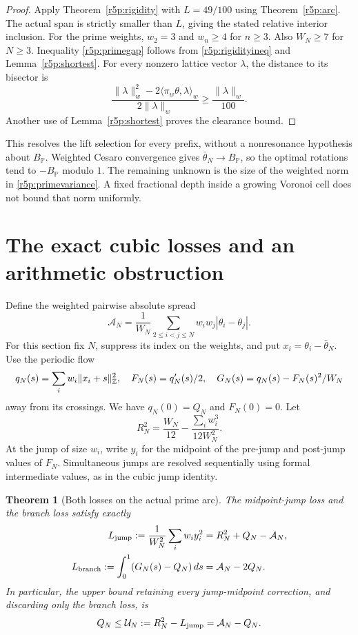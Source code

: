 \documentclass[11pt,a4paper]{article}
\newtheorem{theorem}{Theorem}[section]
\theoremstyle{definition}\newtheorem{definition}[theorem]{Definition}
\theoremstyle{remark}\newtheorem{remark}[theorem]{Remark}
\numberwithin{equation}{section}
\begin{document}
\begin{proof}
Apply Theorem~\ref{r5p:rigidity} with $L=49/100$ using
Theorem~\ref{r5p:arc}.  The actual span is strictly smaller than
$L$, giving the stated relative interior inclusion.
For the prime weights, $w_2=3$ and $w_n\geq4$ for $n\geq3$.
Also $W_N\geq7$ for $N\geq3$.
Inequality \eqref{r5p:primegap} follows from
\eqref{r5p:rigidityineq} and Lemma~\ref{r5p:shortest}.
For every nonzero lattice vector $\lambda$, the distance to its
bisector is
\[
 \frac{\|\lambda\|_w^2-2\langle\pi_w\theta,\lambda\rangle_w}
      {2\|\lambda\|_w}
 \geq\frac{\|\lambda\|_w}{100}.
\]
Another use of Lemma~\ref{r5p:shortest} proves the clearance bound.
\end{proof}

This resolves the lift selection for every prefix, without a
nonresonance hypothesis about $B_{\mathbb P}$.  Weighted Cesaro
convergence gives $\bar\theta_N\to B_{\mathbb P}$, so the optimal
rotations tend to $-B_{\mathbb P}$ modulo $1$.
The remaining unknown is the size of the weighted norm in
\eqref{r5p:primevariance}.  A fixed fractional depth inside a
growing Voronoi cell does not bound that norm uniformly.

\section{The exact cubic losses and an arithmetic obstruction}
\label{r5p:losssection}

Define the weighted pairwise absolute spread
\begin{equation}\label{r5p:Gini}
 \mathcal A_N=\frac1{W_N}
       \sum_{2\leq i<j\leq N}w_iw_j|\theta_i-\theta_j|.
\end{equation}
For this section fix $N$, suppress its index on the weights, and
put $x_i=\theta_i-\bar\theta_N$.  Use the periodic flow
\[
 q_N(s)=\sum_iw_i\|x_i+s\|_{\mathbb Z}^2,
 \quad F_N(s)=q_N'(s)/2,
 \quad G_N(s)=q_N(s)-F_N(s)^2/W_N
\]
away from its crossings.  We have $q_N(0)=Q_N$ and $F_N(0)=0$.
Let
\[
 R_N^2=\frac{W_N}{12}-\frac{\sum_iw_i^3}{12W_N^2}.
\]
At the jump of size $w_i$, write $y_i$ for the midpoint of the
pre-jump and post-jump values of $F_N$.  Simultaneous jumps are
resolved sequentially using formal intermediate values, as in the
cubic jump identity.

\begin{theorem}[Both losses on the actual prime arc]
\label{r5p:losses}
The midpoint-jump loss and the branch loss satisfy exactly
\begin{align}
 L_{\rm jump}
   :=\frac1{W_N^2}\sum_iw_iy_i^2
   &=R_N^2+Q_N-\mathcal A_N,\label{r5p:jumploss}\\
 L_{\rm branch}
   :=\int_0^1(G_N(s)-Q_N)\,ds
   &=\mathcal A_N-2Q_N.\label{r5p:branchloss}
\end{align}
In particular, the upper bound retaining every jump-midpoint
correction, and discarding only the branch loss, is
\begin{equation}\label{r5p:correctedupper}
 Q_N\leq\mathcal U_N:=R_N^2-L_{\rm jump}
                =\mathcal A_N-Q_N.
\end{equation}
\end{theorem}
\end{document}
